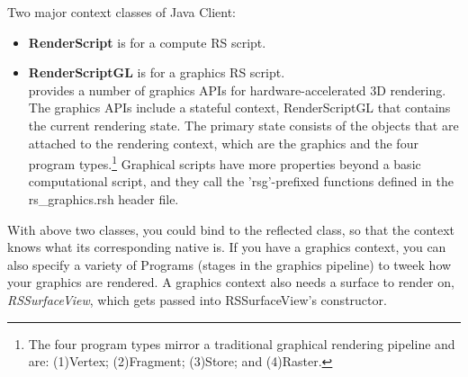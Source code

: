 Two major \RS{} context classes of Java Client: 
\begin{itemize}
\item \textbf{RenderScript} is for a compute RS script.
\item \textbf{RenderScriptGL} is for a graphics RS script.\\\RS{} provides a number of graphics APIs for hardware-accelerated 3D rendering. The \RS{} graphics APIs include a stateful context, RenderScriptGL that contains the current rendering state. The primary state consists of the objects that are attached to the rendering context, which are the graphics \RS{} and the four program types.\footnote{The four program types mirror a traditional graphical rendering pipeline and are: (1)Vertex; (2)Fragment; (3)Store; and (4)Raster.} Graphical scripts have more properties beyond a basic computational script, and they call the 'rsg'-prefixed functions defined in the rs\_graphics.rsh header file. 
\end{itemize}
With above two classes, you could bind to the reflected \RS{} class, so that the \RS{} context knows what its corresponding native \RS{} is. If you have a graphics \RS{} context, you can also specify a variety of Programs (stages in the graphics pipeline) to tweek how your graphics are rendered. A graphics \RS{} context also needs a surface to render on, \textit{RSSurfaceView}, which gets passed into RSSurfaceView's constructor. 

